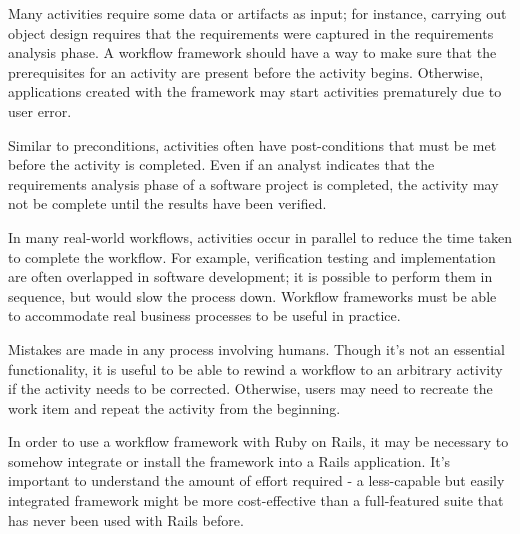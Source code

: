 
Many activities require some data or artifacts as input; for instance, carrying out object design requires that the requirements were captured in the requirements analysis phase. A workflow framework should have a way to make sure that the prerequisites for an activity are present before the activity begins. Otherwise, applications created with the framework may start activities prematurely due to user error.


Similar to preconditions, activities often have post-conditions that must be met before the activity is completed. Even if an analyst indicates that the requirements analysis phase of a software project is completed, the activity may not be complete until the results have been verified.


In many real-world workflows, activities occur in parallel to reduce the time taken to complete the workflow. For example, verification testing and implementation are often overlapped in software development; it is possible to perform them in sequence, but would slow the process down. Workflow frameworks must be able to accommodate real business processes to be useful in practice.


Mistakes are made in any process involving humans. Though it’s not an essential functionality, it is useful to be able to rewind a workflow to an arbitrary activity if the activity needs to be corrected. Otherwise, users may need to recreate the work item and repeat the activity from the beginning.


In order to use a workflow framework with Ruby on Rails, it may be necessary to somehow integrate or install the framework into a Rails application. It’s important to understand the amount of effort required - a less-capable but easily integrated framework might be more cost-effective than a full-featured suite that has never been used with Rails before.


